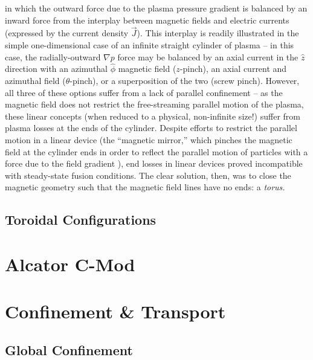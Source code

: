 \noindent in which the outward force due to the plasma pressure gradient is balanced by an inward force from the interplay between magnetic fields and electric currents (expressed by the current density $\vec{J}$).  This interplay is readily illustrated in the simple one-dimensional case of an infinite straight cylinder of plasma -- in this case, the radially-outward $\nabla p$ force may be balanced by an axial current in the $\hat{z}$ direction with an azimuthal $\hat{\phi}$ magnetic field ($z$-pinch), an axial current and azimuthal field ($\theta$-pinch), or a superposition of the two (screw pinch).  However, all three of these options suffer from a lack of parallel confinement -- as the magnetic field does not restrict the free-streaming parallel motion of the plasma, these linear concepts (when reduced to a physical, non-infinite size!) suffer from plasma losses at the ends of the cylinder.  Despite efforts to restrict the parallel motion in a linear device (\eg the ``magnetic mirror,'' which pinches the magnetic field at the cylinder ends in order to reflect the parallel motion of particles with a force due to the field gradient ), end losses in linear devices proved incompatible with steady-state fusion conditions.  The clear solution, then, was to close the magnetic geometry such that the magnetic field lines have no ends: a \emph{torus.}

\subsection{Toroidal Configurations}\label{subsec:intro_toroidal}


\section{Alcator C-Mod}\label{sec:intro_cmod}


\section{Confinement \& Transport}\label{sec:intro_confinement}

\subsection{Global Confinement}\label{subsec:intro_global}

